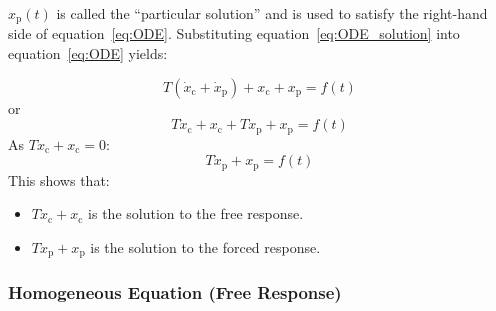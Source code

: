 \documentclass[12pt,letter]{article}
\begin{document}
$x_\text{p}(t)$  is called the ``particular solution'' and is used to satisfy the right-hand side of equation~\ref{eq:ODE}. Substituting equation~\ref{eq:ODE_solution} into equation~\ref{eq:ODE} yields:

\begin{equation}
T(\dot{x}_\text{c} + \dot{x}_\text{p}) + x_\text{c}+x_\text{p} = f(t)
\end{equation}
or
\begin{equation}
T\dot{x}_\text{c} + x_\text{c} + T \dot{x}_\text{p} + x_\text{p} = f(t)
\end{equation}
As $T\dot{x}_\text{c} + x_\text{c}=0$:
\begin{equation}
T \dot{x}_\text{p} + x_\text{p} = f(t)
\end{equation}
This shows that:
\begin{itemize}
\item $T\dot{x}_\text{c} + x_\text{c}$ is the solution to the free response.
\item $T \dot{x}_\text{p} + x_\text{p}$ is the solution to the forced response.
\end{itemize}

\subsubsection{Homogeneous Equation (Free Response)}
\end{document}
